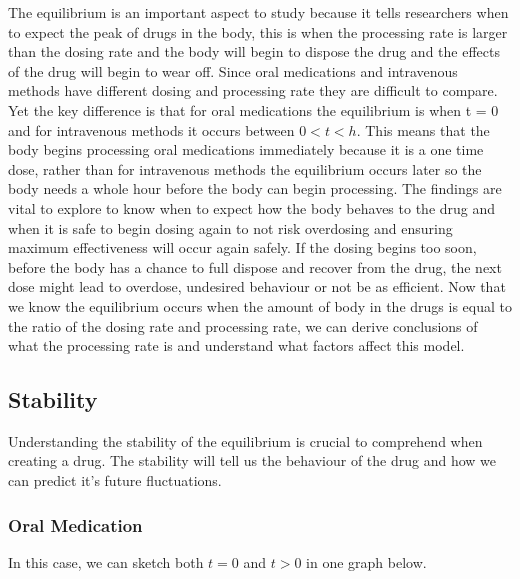\documentclass{article}
\begin{document}
The equilibrium is an important aspect to study because it tells researchers when to expect the peak of drugs in the body, this is when the processing rate is larger than the dosing rate and the body will begin to dispose the drug and the effects of the drug will begin to wear off. Since oral medications and intravenous methods have different dosing and processing rate they are difficult to compare. Yet the key difference is that for oral medications the equilibrium is when t = 0 and for intravenous methods it occurs between $0<t<h$. This means that the body begins processing oral medications immediately because it is a one time dose, rather than for intravenous methods the equilibrium occurs later so the body needs a whole hour before the body can begin processing. The findings are vital to explore to know when to expect how the body behaves to the drug and when it is safe to begin dosing again to not risk overdosing and ensuring maximum effectiveness will occur again safely. If the dosing begins too soon, before the body has a chance to full dispose and recover from the drug, the next dose might lead to overdose, undesired behaviour or not be as efficient. Now that we know the equilibrium occurs when the amount of body in the drugs is equal to the ratio of the dosing rate and processing rate, we can derive conclusions of what the processing rate is and understand what factors affect this model. 

\subsection*{Stability}
Understanding the stability of the equilibrium is crucial to comprehend when creating a drug. The stability will tell us the behaviour of the drug and how we can predict it's future fluctuations.\\

\subsubsection*{Oral Medication}
In this case, we can sketch both $t = 0$ and $t > 0$ in one graph below. \\
\end{document}
